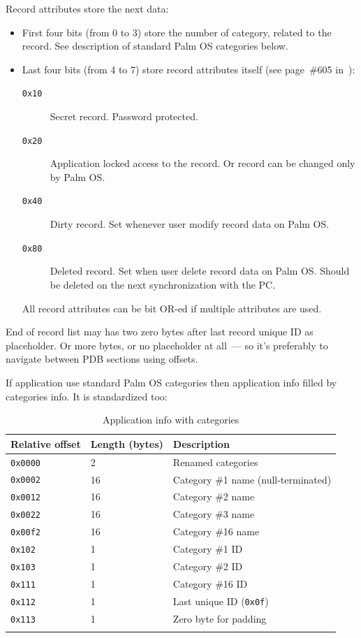 \documentclass[a4paper,12pt,oneside]{scrartcl}
\begin{document}
Record attributes store the next data:
\begin{itemize}
\item First four bits (from 0 to 3) store the number of category, related to the
  record. See description of standard Palm OS categories below.
\item Last four bits (from 4 to 7) store record attributes itself (see
  page~\#605 in~\cite{PalmOSAPIRef}):
  \begin{description}
  \item[\texttt{0x10}] Secret record. Password protected.
  \item[\texttt{0x20}] Application locked access to the record. Or record can be
    changed only by Palm OS.
  \item[\texttt{0x40}] Dirty record. Set whenever user modify record data on
    Palm OS.
  \item[\texttt{0x80}] Deleted record. Set when user delete record data on Palm
    OS. Should be deleted on the next synchronization with the PC.
  \end{description}

  All record attributes can be bit OR-ed if multiple attributes are used.
\end{itemize}

End of record list may has two zero bytes after last record unique ID as
placeholder. Or more bytes, or no placeholder at all~--- so it's preferably to
navigate between PDB sections using offsets.

If application use standard Palm OS categories then application info filled by
categories info. It is standardized too:
\begin{longtable}{|p{2cm}|p{4cm}|p{7cm}|}
  \hline
  \textbf{Relative offset} & \textbf{Length (bytes)} & \textbf{Description} \\
  \hline
  \texttt{0x0000} & 2 & Renamed categories \\
  \hline
  \texttt{0x0002} & 16 & Category \#1 name (null-terminated) \\
  \hline
  \texttt{0x0012} & 16 & Category \#2 name \\
  \hline
  \texttt{0x0022} & 16 & Category \#3 name \\
  \hline
  \hline
  \texttt{0x00f2} & 16 & Category \#16 name \\
  \hline
  \texttt{0x102} & 1 & Category \#1 ID \\
  \hline
  \texttt{0x103} & 1 & Category \#2 ID \\
  \hline
  \hline
  \texttt{0x111} & 1 & Category \#16 ID \\
  \hline
  \texttt{0x112} & 1 & Last unique ID (\texttt{0x0f}) \\
  \hline
  \texttt{0x113} & 1 & Zero byte for padding \\
  \hline
  \caption{Application info with categories}
  \label{tab:application-info-categories}
\end{longtable}
\end{document}

